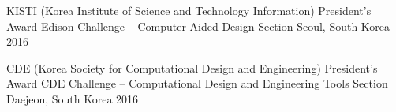

\begin{cvhonors}


\cvhonor
{KISTI (Korea Institute of Science and Technology Information) President’s Award} %
{Edison Challenge –  Computer Aided Design Section} %
{Seoul, South Korea} %
{2016} %


\cvhonor
{CDE (Korea Society for Computational Design and Engineering) President’s Award} %
{CDE Challenge – Computational Design and Engineering Tools Section} %
{Daejeon, South Korea} %
{2016} %


\end{cvhonors}
